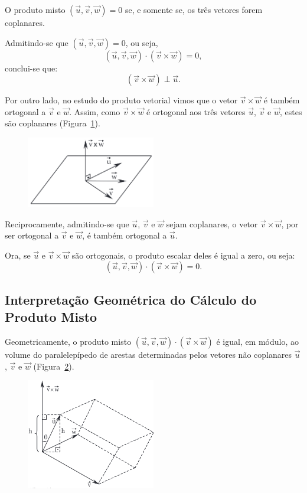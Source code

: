 O produto misto $(\vec{u}, \vec{v}, \vec{w}) = 0$ se, e somente se, os três
vetores forem coplanares.

Admitindo-se que $(\vec{u}, \vec{v}, \vec{w}) = 0$, ou seja,
\[
  (\vec{u}, \vec{v}, \vec{w}) \cdot (\vec{v} \times \vec{w}) = 0,
\]
conclui-se que:
\[
  (\vec{v} \times \vec{w}) \perp \vec{u}.
\]

Por outro lado, no estudo do produto vetorial vimos que o vetor $\vec{v} \times
\vec{w}$ é também ortogonal a $\vec{v}$ e $\vec{w}$. Assim, como $\vec{v} \times
\vec{w}$ é ortogonal aos três vetores $\vec{u}$, $\vec{v}$ e $\vec{w}$, estes
são coplanares (Figura~\ref{fig:fig4.1}).

\begin{figure}[H]
  \begin{center}
    \includegraphics[width=0.5\textwidth]{./fig/fig4.1.png}\label{fig:fig4.1}
  \end{center}
\end{figure}

Reciprocamente, admitindo-se que $\vec{u}$, $\vec{v}$ e $\vec{w}$ sejam
coplanares, o vetor $\vec{v} \times \vec{w}$, por ser ortogonal a $\vec{v}$ e
$\vec{w}$, é também ortogonal a $\vec{u}$.

Ora, se $\vec{u}$ e $\vec{v} \times \vec{w}$ são ortogonais, o produto escalar
deles é igual a zero, ou seja:
\[
  (\vec{u}, \vec{v}, \vec{w}) \cdot (\vec{v} \times \vec{w}) = 0.
\]

\newpage
\subsection{Interpretação Geométrica do Cálculo do Produto Misto}

Geometricamente, o produto misto $(\vec{u}, \vec{v}, \vec{w}) \cdot (\vec{v}
\times \vec{w})$ é igual, em módulo, ao volume do paralelepípedo de arestas
determinadas pelos vetores não coplanares $\vec{u}$, $\vec{v}$ e $\vec{w}$
(Figura~\ref{fig:fig4.3}).

\begin{figure}[H]
  \begin{center}
    \includegraphics[width=0.5\textwidth]{./fig/fig4.3.png}\label{fig:fig4.3}
  \end{center}
\end{figure}

